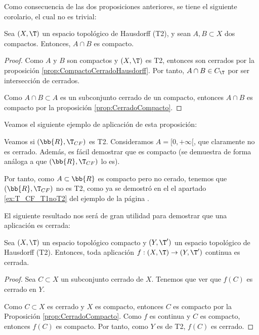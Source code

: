 Como consecuencia de las dos proposiciones anteriores, se tiene el siguiente corolario, el cual no es trivial:
\begin{coro}
    Sea $(X,\T)$ un espacio topológico de Hausdorff (T2), y sean $A,B\subset X$ dos compactos. Entonces, $A\cap B$ es compacto.
\end{coro}
\begin{proof}
    Como $A$ y $B$ son compactos y $(X,\T)$ es T2, entonces son cerrados por la proposición \ref{prop:CompactoCerradoHausdorff}.
    Por tanto, $A\cap B\in C_\T$ por ser intersección de cerrados.

    Como $A\cap B\subset A$ es un subconjunto cerrado de un compacto, entonces $A\cap B$ es compacto por la proposición \ref{prop:CerradoCompacto}.
\end{proof}

Veamos el siguiente ejemplo de aplicación de esta proposición:
\begin{ejemplo}
    Veamos si $(\bb{R},\T_{CF})$ es T2. Consideramos $A=[0,+\infty[$, que claramente no es cerrado.
    Además, es fácil demostrar que es compacto (se demuestra de forma análoga a que $(\bb{R},\T_{CF})$ lo es).

    Por tanto, como $A\subset \bb{R}$ es compacto pero no cerado, tenemos que $(\bb{R},\T_{CF})$ no es T2, como ya se demostró en el el apartado \ref{ex:T_CF_T1noT2} del ejemplo de la página \pageref{ex:T_CF_T1noT2}.
\end{ejemplo}


El siguiente resultado nos será de gran utilidad para demostrar que una aplicación es cerrada:
\begin{teo}\label{teo:ContinuaEntoncesCerrada}
    Sea $(X,\T)$ un espacio topológico compacto y $(Y,\T')$ un espacio topológico de Hausdorff (T2).
    Entonces, toda aplicación $f:(X,\T)\to (Y,\T')$ continua es cerrada.
\end{teo}
\begin{proof}
    Sea $C\subset X$ un subconjunto cerrado de $X$. Tenemos que ver que $f(C)$ es cerrado en $Y$.
    
    Como $C\subset X$ es cerrado y $X$ es compacto, entonces $C$ es compacto por la Proposición \ref{prop:CerradoCompacto}.
    Como $f$ es continua y $C$ es compacto, entonces $f(C)$ es compacto. Por tanto, como $Y$ es de T2, $f(C)$ es cerrado.
\end{proof}


